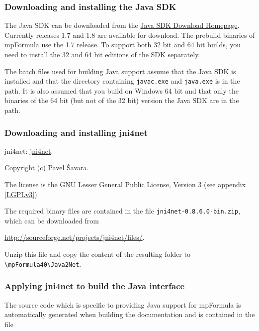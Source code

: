 \subsubsection{Downloading and installing the Java SDK}

The Java SDK can be downloaded from the \href{http://www.oracle.com/technetwork/java/javase/downloads/index.html}{Java SDK Download Homepage}. Currently releases 1.7 and 1.8 are available for download. The prebuild binaries of mpFormula use the 1.7 release. To support both 32 bit and 64 bit builds, you need to install the 32 and 64 bit editions of the SDK separately.

The batch files used for building Java support assume that the Java SDK is installed and that the directory containing \verb|javac.exe| and \verb|java.exe| is in the path. It is also assumed that you build on Windows 64 bit and that only the binaries of the 64 bit (but not of the 32 bit) version the Java SDK are in the path. 


\subsubsection{Downloading and installing jni4net}

jni4net: \href{http://jni4net.com/}{jni4net}. 

Copyright (c) Pavel \^{S}avara.


The license is the GNU Lesser General Public License, Version 3 (see appendix \ref{LGPLv3})


\vpara
The required binary files are contained in the file \verb|jni4net-0.8.6.0-bin.zip|, which can be downloaded from 

\href{http://sourceforge.net/projects/jni4net/files/}{http://sourceforge.net/projects/jni4net/files/}.



Unzip this file and copy the content of the resulting folder to \verb|\mpFormula40\Java2Net|. 

\subsubsection{Applying jni4net to build the Java interface}
The source code which is specific to providing Java support for mpFormula is automatically generated when building the documentation and is contained in the file 

